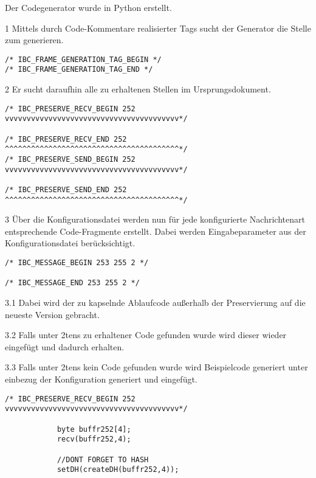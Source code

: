 Der Codegenerator wurde in Python erstellt. 
\begin{itemize} 
	\item 1 Mittels durch Code-Kommentare realisierter Tags sucht der Generator die Stelle zum generieren. 
		\begin{center}
			\begin{verbatim}
/* IBC_FRAME_GENERATION_TAG_BEGIN */ 
/* IBC_FRAME_GENERATION_TAG_END */ 
			\end{verbatim}
		\begin{center}

	\item 2 Er sucht daraufhin alle zu erhaltenen Stellen im Ursprungsdokument. 

		\begin{verbatim}
/* IBC_PRESERVE_RECV_BEGIN 252 vvvvvvvvvvvvvvvvvvvvvvvvvvvvvvvvvvvvvvvv*/
			
/* IBC_PRESERVE_RECV_END 252 ^^^^^^^^^^^^^^^^^^^^^^^^^^^^^^^^^^^^^^^^*/
/* IBC_PRESERVE_SEND_BEGIN 252 vvvvvvvvvvvvvvvvvvvvvvvvvvvvvvvvvvvvvvvv*/
			
/* IBC_PRESERVE_SEND_END 252 ^^^^^^^^^^^^^^^^^^^^^^^^^^^^^^^^^^^^^^^^*/
		\end{verbatim}

	\item 3 Über die Konfigurationsdatei werden nun für jede konfigurierte Nachrichtenart entsprechende Code-Fragmente erstellt. Dabei werden Eingabeparameter aus der Konfigurationsdatei berücksichtigt.
		\begin{verbatim}
/* IBC_MESSAGE_BEGIN 253 255 2 */

/* IBC_MESSAGE_END 253 255 2 */
		\end{verbatim}
	\item 3.1 Dabei wird der zu kapselnde Ablaufcode außerhalb der Preservierung auf die neueste Version gebracht.
	\item 3.2 Falls unter 2tens zu erhaltener Code gefunden wurde wird dieser wieder eingefügt und dadurch erhalten.
	\item 3.3 Falls unter 2tens kein Code gefunden wurde wird Beispielcode generiert unter einbezug der Konfiguration generiert und eingefügt.

		\begin{verbatim}
/* IBC_PRESERVE_RECV_BEGIN 252 vvvvvvvvvvvvvvvvvvvvvvvvvvvvvvvvvvvvvvvv*/
			
			byte buffr252[4];
			recv(buffr252,4);
			
			//DONT FORGET TO HASH
			setDH(createDH(buffr252,4));
			

\end{verbatim}
\end{center}
\end{center}
\end{itemize}
